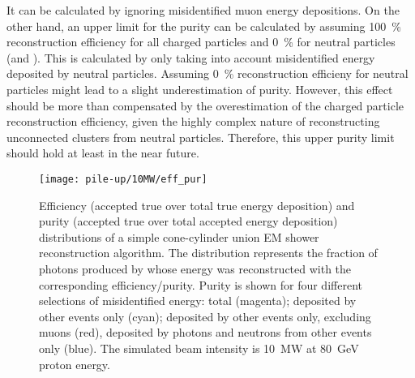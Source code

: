 It can be calculated by ignoring misidentified muon energy depositions.
On the other hand, an upper limit for the purity can be calculated by assuming \SI{100}{\percent} reconstruction efficiency for all charged particles and \SI{0}{\percent} for neutral particles (\Pgpz and \Pgg).
This is calculated by only taking into account misidentified energy deposited by neutral particles.
Assuming \SI{0}{\percent} reconstruction efficieny for neutral particles might lead to a slight underestimation of purity.
However, this effect should be more than compensated by the overestimation of the charged particle reconstruction efficiency, given the highly complex nature of reconstructing unconnected clusters from neutral particles.
Therefore, this upper purity limit should hold at least in the near future.

\begin{figure}[htb]
	\centering
	\texttt{[image: pile-up/10MW/eff\_pur]}
	\caption{Efficiency (accepted true over total true energy deposition) and purity (accepted true over total accepted energy deposition) distributions of a simple cone-cylinder union EM shower reconstruction algorithm.
	The distribution represents the fraction of photons produced by \Pgpz whose energy was reconstructed with the corresponding efficiency/purity.
	Purity is shown for four different selections of misidentified energy: total (magenta); deposited by other events only (cyan); deposited by other events only, excluding muons (red), deposited by photons and neutrons from other events only (blue).
	The simulated beam intensity is \SI{10}{\mega\watt} at \SI{80}{\giga\electronvolt} proton energy.}
	\label{fig:dune-nd_10MW-eff-pur}
\end{figure}

